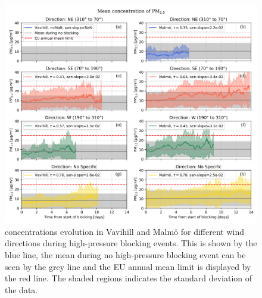 \begin{figure}[H]
    \centering
    \includegraphics[width=\textwidth]{Figures/Meanplot_dir.png}
    \caption{\PM concentrations evolution in Vavihill and Malmö for different wind directions during high-pressure blocking events. This is shown by the blue line, the mean during no high-pressure blocking event can be seen by the grey line and the EU annual mean limit is displayed by the red line. The shaded regions indicates the standard deviation of the data.}
    \label{fig:Meanplot_wind}
\end{figure}

\newpage 


